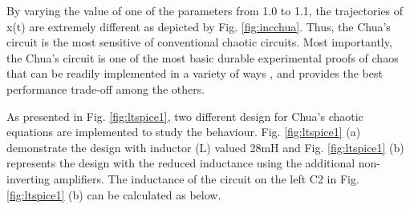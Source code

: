 By varying the value of one of the parameters from 1.0 to 1.1, the trajectories of x(t) are extremely
different as depicted by Fig. \ref{fig:incchua}. Thus, the Chua's circuit is the most sensitive of conventional chaotic circuits. %
Most importantly, the Chua's circuit is one of the most basic durable experimental proofs of chaos that can be readily implemented in a variety of ways \cite{fortuna2009chua}, and provides the best performance trade-off among the others. %

As presented in Fig. \ref{fig:ltspice1}, two different design for Chua's chaotic equations are implemented to study the behaviour. Fig. \ref{fig:ltspice1} (a) demonstrate the design with inductor (L) valued 28mH and Fig. \ref{fig:ltspice1} (b) represents the design with the reduced inductance using the additional non-inverting amplifiers. The inductance of the circuit on the left C2 in Fig. \ref{fig:ltspice1} (b) can be calculated as below. 
